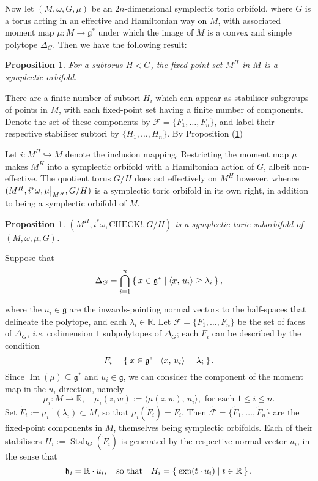 \documentclass{amsart}
\newtheorem{prop}[theorem]{Proposition}
\newcommand{\ie}{\emph{i.e.} }
\newcommand{\ra}{\rightarrow}
\newcommand{\w}{\omega}
\newcommand{\RR}{\mathbb{R}}
\newcommand{\mcF}{\mathcal{F}}
\newcommand{\mfg}{\mathfrak{g}}
\newcommand{\mfh}{\mathfrak{h}}
\DeclareMathOperator{\Image}{Im}
\DeclareMathOperator{\Stab}{Stab}
\newcommand\restr[2]{{%
		\left.\kern-\nulldelimiterspace %
		#1 %
		\vphantom{\big|} %
		\right|_{#2} %
}}
\begin{document}
	Now let $(M, \w, G, \mu)$ be an $2n$-dimensional symplectic toric orbifold, where $G$ is a torus acting in an effective and Hamiltonian way on $M$, with associated moment map $\mu : M \ra \mfg^{\ast}$ under which the image of $M$ is a convex and simple polytope $\Delta_{G}$. Then we have the following result:
	
	\begin{prop}\label{thm:fixed-point-suborbifld}
		For a subtorus $H \lhd G$, the fixed-point set $M^{H}$ in $M$ is a symplectic orbifold.
	\end{prop}
	
    There are a finite number of subtori $H_{i}$ which can appear as stabiliser subgroups of points in $M$, with each fixed-point set having a finite number of components. Denote the set of these components by $\mcF = \{F_{1}, \ldots, F_{n} \}$, and label their respective stabiliser subtori by $\{H_{1}, \ldots, H_{n}\}$. By Proposition (\ref{thm:fixed-point-suborbifld}) 
    
    Let $i: M^{H} \hookrightarrow M$ denote the inclusion mapping.
	Restricting the moment map $\mu$ makes $M^{H}$ into a symplectic orbifold with a Hamiltonian action of $G$, albeit non-effective. The quotient torus $G/H$ does act effectively on $M^{H}$ however, whence $(M^{H}, i^{\ast}\w, \restr{\mu}{M^{H}}, G/H)$ is a symplectic toric orbifold in its own right, in addition to being a symplectic orbifold of $M$.
	
    
    
	\begin{prop}
		$(M^{H}, i^{\ast}\w, \text{CHECK!}, G/H)$ is a symplectic toric suborbifold of $(M, \w, \mu , G)$.
	\end{prop}

	Suppose that
	\[
		\Delta_{G} = \bigcap_{i=1}^{n} \Set{x \in \mfg^{\ast} | \langle x,\, u_{i} \rangle \geq \lambda_{i} },
	\]

    where the $u_{i} \in \mfg$ are the inwards-pointing normal vectors to the half-spaces that delineate the polytope, and each $\lambda_{i} \in \mathbb{R}$. Let $\mcF = \{ F_{1}, \ldots, F_{n}\}$ be the set of faces of $\Delta_{G}$, \ie codimension $1$ subpolytopes of $\Delta_{G}$; each $F_{i}$ can be described by the condition
    \[
        F_{i} = \Set{ x \in \mfg^{\ast} | \langle x,\, u_{i} \rangle = \lambda_{i} }.
    \]
    Since $\Image(\mu) \subseteq \mfg^{\ast}$ and $u_{i} \in \mfg$, we can consider the component of the moment map in the $u_{i}$ direction, namely
    \[
        \mu_{i} : M \ra \RR, \quad \mu_{i}(z,w) := \langle \mu(z,w),\, u_{i} \rangle, \text{ for each } 1 \leq i \leq n.
    \]
    Set $\tilde{F}_{i} := \mu_{i}^{-1}(\lambda_{i}) \subset M$, so that $\mu_{i}(\tilde{F}_{i}) = F_{i}$. Then $\tilde{\mcF} = \{\tilde{F}_{1}, \ldots, \tilde{F}_{n}\}$ are the fixed-point components in $M$, themselves being symplectic orbifolds. Each of their stabilisers $H_{i} := \Stab_{G}(\tilde{F}_{i})$ is generated by the respective normal vector $u_{i}$, in the sense that
    \[
    	\mfh_{i} = \RR\cdot u_{i}, \quad \text{so that} \quad H_{i} = \Set{\exp(t\cdot u_{i}) | t \in \RR}.
    \]
    
\end{document}
